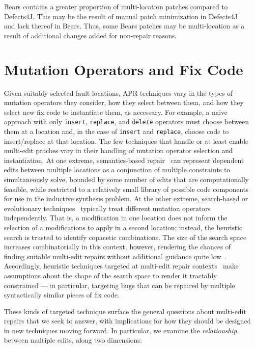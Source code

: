 \documentclass[sigconf, timestamp-false, anonymous=true]{acmart}
\begin{document}
Bears contains a greater proportion of 
multi-location patches compared to Defects4J. This may be the 
result of manual patch minimization in Defects4J~\cite{defects4j} 
and lack thereof in Bears.
Thus, some Bears patches may be multi-location as a result of additional 
changes added for non-repair reasons.






\section{Mutation Operators and Fix Code}
\label{sec:mutops}

Given suitably selected fault locations, APR techniques vary in the types of
mutation operators they consider, how they select between them, and how they
select new fix code to instantiate them, as necessary.  For example, a naive
approach with only \texttt{insert}, \texttt{replace}, and \texttt{delete}
operators must choose between them at a location and, in the case of
\texttt{insert} and \texttt{replace}, choose code to insert/replace at that
location.  
%
The few techniques that handle or at least enable multi-edit patches vary in their
handling of mutation operator selection and instantiation.  At one
extreme, semantics-based repair~\cite{s3,angelix} can represent dependent edits between multiple
locations as a conjunction of multiple constraints to simultaneously solve,
bounded by some number of edits that are computationally feasible, while
restricted to a relatively small library of possible code components for use in
the inductive synthesis problem.    At the other extreme, search-based or
evolutionary techniques~\cite{genprog,others} typically treat different mutation
operators independently.  That is, a modification in one location does not
inform the selection of a modifications to apply in a second location; instead,
the heuristic search is trusted to identify copacetic combinations.  The size of
the search space increases combinatorially in this context, however, rendering
the chances of finding suitable multi-edit repairs without additional guidance
quite low~\cite{ae,long2016}. Accordingly, heuristic techniques targeted at multi-edit
repair contexts~\cite{hercules,maybewang2018} make assumptions about the
shape of the search space to render it tractably constrained --- in particular,
targeting bugs that can be repaired by multiple syntactically similar pieces of
fix code.

These kinds of targeted technique surface the general questions about
multi-edit repairs that we seek to answer, with
implications for how they should be designed in new techniques moving forward.
In particular, we examine the \emph{relationship} between multiple edits, along
two dimensions:
\end{document}
